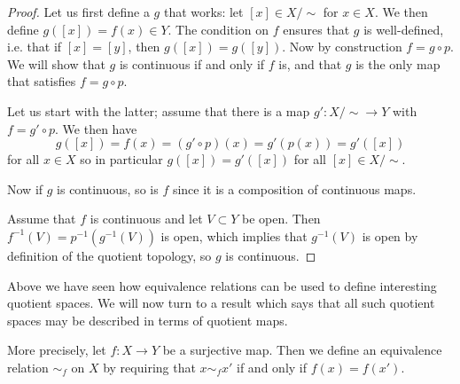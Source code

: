 \begin{proof}
  Let us first define a $g$ that works: let $[x] \in X/\!\sim$ for $x \in X$. We then define $g([x]) = f(x) \in Y$. The condition on $f$ ensures that $g$ is well-defined, i.e. that if $[x] = [y]$, then $g([x]) = g([y])$. Now by construction $f = g \circ p$. We will show that $g$ is continuous if and only if $f$ is, and that $g$ is the only map that satisfies $f = g \circ p$.
  
  Let us start with the latter; assume that there is a map $g' : X/\!\sim \to Y$ with $f = g' \circ p$. We then have
  \[
    g([x]) = f(x) = (g' \circ p)(x) = g'(p(x)) = g'([x])
  \]
  for all $x \in X$ so in particular $g([x]) = g'([x])$ for all $[x] \in X/\!\sim$.
  
  Now if $g$ is continuous, so is $f$ since it is a composition of continuous maps.
  
  Assume that $f$ is continuous and let $V \subset Y$ be open. Then $f^{-1}(V) = p^{-1}(g^{-1}(V))$ is open, which implies that $g^{-1}(V)$ is open by definition of the quotient topology, so $g$ is continuous.
\end{proof}
Above we have seen how equivalence relations can be used to define interesting quotient spaces. We will now turn to a result which says that all such quotient spaces may be described in terms of quotient maps.

More precisely, let $f :X \to Y$ be a surjective map. Then we define an equivalence relation $\sim_f$ on $X$ by requiring that $x \sim_f x'$ if and only if $f(x) = f(x')$.

